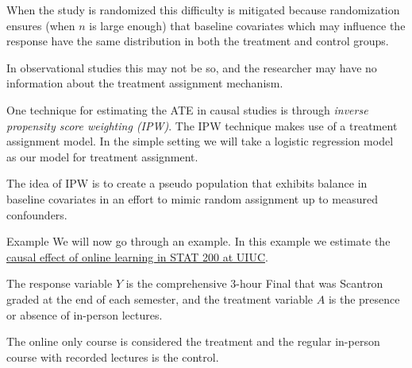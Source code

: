 \documentclass[
  ignorenonframetext,
]{beamer}
\begin{document}
\begin{frame}{}
\protect\hypertarget{section-11}{}
When the study is randomized this difficulty is mitigated because
randomization ensures (when \(n\) is large enough) that baseline
covariates which may influence the response have the same distribution
in both the treatment and control groups.

\vspace{12pt}

In observational studies this may not be so, and the researcher may have
no information about the treatment assignment mechanism.

\vspace{12pt}

One technique for estimating the ATE in causal studies is through
\emph{inverse propensity score weighting (IPW)}. The IPW technique makes
use of a treatment assignment model. In the simple setting we will take
a logistic regression model as our model for treatment assignment.

\vspace{12pt}

The idea of IPW is to create a pseudo population that exhibits balance
in baseline covariates in an effort to mimic random assignment up to
measured confounders.
\end{frame}

\begin{frame}{Example}
\protect\hypertarget{example}{}
We will now go through an example. In this example we estimate the
\href{https://arxiv.org/abs/2101.06755}{causal effect of online learning
in STAT 200 at UIUC}.

\vspace{12pt}

The response variable \(Y\) is the comprehensive 3-hour Final that was
Scantron graded at the end of each semester, and the treatment variable
\(A\) is the presence or absence of in-person lectures.

\vspace{12pt}

The online only course is considered the treatment and the regular
in-person course with recorded lectures is the control.
\end{frame}
\end{document}
